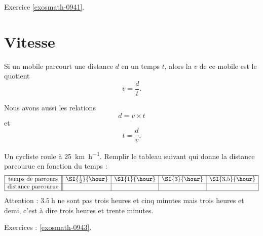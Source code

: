 Exercice \ref{exosmath-0941}.

\section{Vitesse}

\begin{definition}
    Si un mobile parcourt une distance $d$ en un temps $t$, alors la  $v$ de ce mobile est le quotient
    \begin{equation}
        v=\frac{ d }{ t }.
    \end{equation}
\end{definition}

\begin{Aretenir}
    Nous avons aussi les relations
    \begin{equation}
        d=v\times t
    \end{equation}
    et
    \begin{equation}
        t=\frac{ d }{ v }.
    \end{equation}
\end{Aretenir}

\begin{example}
    Un cycliste roule à \SI{25}{\kilo\meter\per\hour}. Remplir le tableau suivant qui donne la distance parcourue en fonction du temps :
    \begin{equation*}
        \begin{array}[]{|c||c|c|c|c|}
            \hline
            \text{temps de parcours}&\SI{\frac{ 1 }{2}}{\hour}&\SI{1}{\hour}&\SI{3}{\hour}&\SI{3.5}{\hour}\\
            \hline
            \text{distance parcourue}&&&&\\
            \hline
        \end{array}
    \end{equation*}
    Attention : \( \SI{3.5}{\hour}\) ne sont pas trois heures et cinq minutes mais trois heures et demi, c'est à dire trois heures et trente minutes.
\end{example}

Exercices : \ref{exosmath-0943}.

